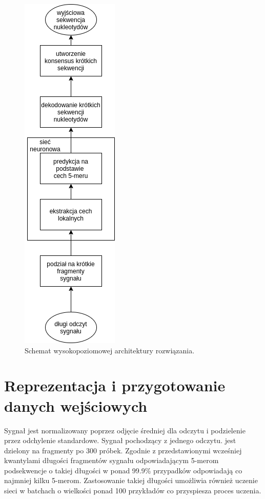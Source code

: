 \documentclass[a4paper,11pt,twoside]{report}
\theoremstyle{definition}
\begin{document}
\begin{figure}[h!]
	\centering
	\includegraphics[scale=0.5]{architecture}
	\caption{Schemat wysokopoziomowej architektury rozwiązania.}
\end{figure}


\section{Reprezentacja i przygotowanie danych wejściowych}

Sygnał jest normalizowany poprzez odjęcie średniej dla odczytu i podzielenie przez odchylenie standardowe. Sygnał pochodzący z jednego odczytu. jest dzielony na fragmenty po 300 próbek. Zgodnie z przedstawionymi wcześniej kwantylami długości fragmentów sygnału odpowiadającym 5-merom podsekwencje o takiej długości w ponad 99.9\% przypadków odpowiadają co najmniej kilku 5-merom. Zastosowanie takiej długości umożliwia również uczenie sieci w batchach o wielkości ponad 100 przykładów co przyspiesza proces uczenia. 
\end{document}
